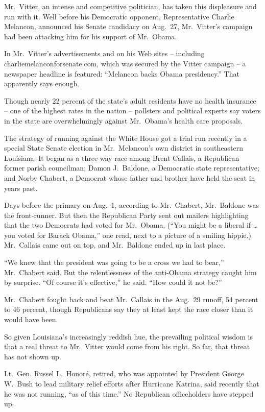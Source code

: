 ﻿\documentclass[12pt]{article}
\begin{document}
Mr.~Vitter, an intense and competitive politician, has taken this displeasure and run with it. Well
before his Democratic opponent, Representative Charlie Melancon, announced his Senate candidacy on
Aug.~27, Mr.~Vitter's campaign had been attacking him for his support of Mr.~Obama.

In Mr.~Vitter's advertisements and on his Web sites -- including charliemelanconforsenate.com, which
was secured by the Vitter campaign -- a newspaper headline is featured: ``Melancon backs Obama
presidency.'' That apparently says enough.

Though nearly 22 percent of the state's adult residents have no health insurance -- one of the
highest rates in the nation -- pollsters and political experts say voters in the state are
overwhelmingly against Mr.~Obama's health care proposals.

The strategy of running against the White House got a trial run recently in a special State Senate
election in Mr.~Melancon's own district in southeastern Louisiana. It began as a three-way race
among Brent Callais, a Republican former parish councilman; Damon J.~Baldone, a Democratic state
representative; and Norby Chabert, a Democrat whose father and brother have held the seat in years
past.

Days before the primary on Aug.~1, according to Mr.~Chabert, Mr.~Baldone was the front-runner. But
then the Republican Party sent out mailers highlighting that the two Democrats had voted for
Mr.~Obama. (``You might be a liberal if \ldots you voted for Barack Obama,'' one read, next to a
picture of a smiling hippie.) Mr.~Callais came out on top, and Mr.~Baldone ended up in last place.

``We knew that the president was going to be a cross we had to bear,'' Mr.~Chabert said. But the
relentlessness of the anti-Obama strategy caught him by surprise. ``Of course it's effective,'' he
said. ``How could it not be?''

Mr.~Chabert fought back and beat Mr.~Callais in the Aug.~29 runoff, 54 percent to 46 percent, though
Republicans say they at least kept the race closer than it would have been.

So given Louisiana's increasingly reddish hue, the prevailing political wisdom is that a real threat
to Mr.~Vitter would come from his right. So far, that threat has not shown up.

Lt.~Gen. Russel L.~Honor\'e, retired, who was appointed by President George W.~Bush to lead military
relief efforts after Hurricane Katrina, said recently that he was not running, ``as of this time.''
No Republican officeholders have stepped up.
\end{document}
